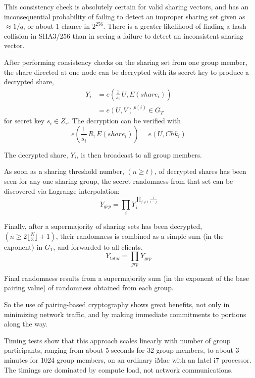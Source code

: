 \documentclass{yellowpaper}
\begin{document}
This consistency check is absolutely certain for valid sharing vectors, and has an inconsequential probability of failing to detect an improper sharing set given as $\approx 1/q$, or about 1 chance in $2^{256}$. There is a greater likelihood of finding a hash collision in SHA3/256 than in seeing a failure to detect an inconsistent sharing vector.

After performing consistency checks on the sharing set from one group member, the share directed at one node can be decrypted with its secret key to produce a decrypted share, 
$$
\begin{align}
Y_i &= e(\frac{1}{s_i}\, U, E(share_i)) \\ 
       &= e(U,V)^{p(i)} \in G_T
\end{align}
$$
for secret key $s_i \in Z_r$. The decryption can be verified with
$$ e(\frac{1}{s_i} \, R, E(share_i)) = e(U, Chk_i)$$


The decrypted share, $Y_i$, is then broadcast to all group members. 

As soon as a sharing threshold number, $(n \ge t)$, of decrypted shares has been seen for any one sharing group, the secret randomness from that set can be discovered via Lagrange interpolation:
$$Y_{grp} = \prod_i Y_i^{\prod_{j \ne i} \frac{i}{i-j}}$$

Finally, after a supermajority of sharing sets has been decrypted, $(n \ge 2 \lfloor \frac{N}{3} \rfloor + 1)$, their randomness is combined as a simple sum (in the exponent) in $G_T$, and forwarded to all clients.
$$Y_{total} = \prod_{grp} Y_{grp}$$

Final randomness results from a supermajority sum (in the exponent of the base pairing value) of randomness obtained from each group. 

So the use of pairing-based cryptography shows great benefits, not only in minimizing network traffic, and by making immediate commitments to portions along the way.

Timing tests show that this approach scales linearly with number of group participants, ranging from about 5 seconds for 32 group members, to about 3 minutes for 1024 group members, on an ordinary iMac with an Intel i7 processor. The timings are dominated by compute load, not network communications.
\end{document}
